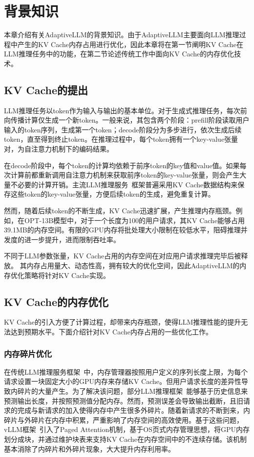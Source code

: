 \section{背景知识}

本章介绍有关AdaptiveLLM的背景知识。由于AdaptiveLLM主要面向LLM推理过程中产生的KV Cache内存占用进行优化，因此本章将在第一节阐明KV Cache在LLM推理任务中的功能，在第二节论述传统工作中面向KV Cache的内存优化技术。

\subsection{KV Cache的提出}

LLM推理任务以token作为输入与输出的基本单位。对于生成式推理任务，每次前向传播计算仅生成一个新token。一般来说，其包含两个阶段：prefill阶段读取用户输入的token序列，生成第一个token；decode阶段分为多步进行，依次生成后续token，直至得到终止token。在推理过程中，每个token拥有一个key-value张量对，为自注意力机制下的编码结果。

在decode阶段中，每个token的计算均依赖于前序token的key值和value值。如果每次计算前都重新调用自注意力机制来获取前序token的key-value张量，则会产生大量不必要的计算开销。主流LLM推理服务~\cite{Swapping, vLLM, ORCA, SpecInfer,SARATHI}框架普遍采用KV Cache数据结构来保存这些token的key-value张量，方便后续token的生成，避免重复计算。

然而，随着后续token的不断生成，KV Cache迅速扩展，产生推理内存瓶颈。例如，在OPT-13B模型中，对于一个长度为100的用户请求，其KV Cache能够占用39.1MB的内存空间。有限的GPU内存将批处理大小限制在较低水平，阻碍推理并发度的进一步提升，进而限制吞吐率。

不同于LLM参数张量，KV Cache占用的内存空间在对应用户请求推理完毕后被释放。 其内存占用量大、动态性高，拥有较大的优化空间，因此AdaptiveLLM的内存优化策略将针对KV Cache实现。

\subsection{KV Cache的内存优化}

KV Cache的引入方便了计算过程，却带来内存瓶颈，使得LLM推理性能的提升无法达到预期水平。下面介绍针对KV Cache内存占用的一些优化工作。

\subsubsection{内存碎片优化}

在传统LLM推理服务框架~\cite{Swapping}中，内存管理器按照用户定义的序列长度上限，为每个请求设置一块固定大小的GPU内存来存储KV Cache。但用户请求长度的差异性导致内碎片的大量产生。为了解决该问题，部分LLM推理框架~\cite{Output-Length-Prediction}能够基于历史信息来预测输出长度，并按照预测值分配内存。然而，预测误差会导致输出截断，且旧请求的完成与新请求的加入使得内存中产生很多外碎片。随着新请求的不断到来，内碎片与外碎片在内存中积累，严重影响了内存空间的高效使用。基于这些问题，vLLM框架~\cite{vLLM}引入了Paged Attention机制，基于OS页式内存管理思想，将GPU内存划分成块，并通过维护块表来支持KV Cache在内存空间中的不连续存储。该机制基本消除了内碎片和外碎片现象，大大提升内存利用率。

